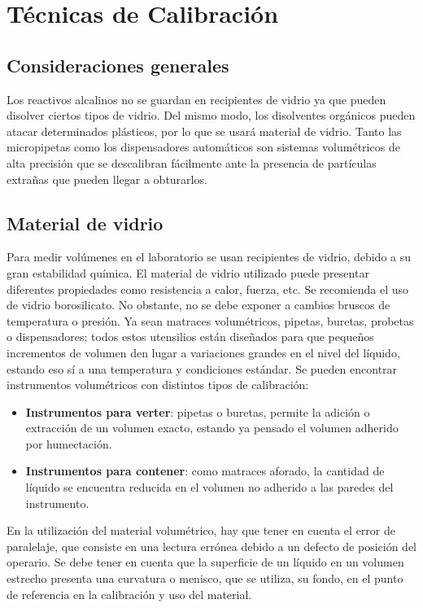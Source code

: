 \chapter{Técnicas de Calibración}
\section{Consideraciones generales}
Los reactivos alcalinos no se guardan en recipientes de vidrio ya que pueden disolver ciertos tipos de vidrio. Del mismo modo, los disolventes orgánicos pueden atacar determinados plásticos, por lo que se usará material de vidrio. Tanto las micropipetas como los dispensadores automáticos son sistemas volumétricos de alta precisión que se descalibran fácilmente ante la presencia de partículas extrañas que pueden llegar a obturarlos.
\section{Material de vidrio}
Para medir volúmenes en el laboratorio se usan recipientes de vidrio, debido a su gran estabilidad química. El material de vidrio utilizado puede presentar diferentes propiedades como resistencia a calor, fuerza, etc. Se recomienda el uso de vidrio borosilicato. No obstante, no se debe exponer a cambios bruscos de temperatura o presión. Ya sean matraces volumétricos, pipetas, buretas, probetas o dispensadores; todos estos utensilios están diseñados para que pequeños incrementos de volumen den lugar a variaciones grandes en el nivel del líquido, estando eso sí a una temperatura y condiciones estándar. Se pueden encontrar instrumentos volumétricos con distintos tipos de calibración:
\begin{itemize}[itemsep=0pt,parsep=0pt,topsep=0pt,partopsep=0pt]
    \item \textbf{Instrumentos para verter}: pipetas o buretas, permite la adición o extracción de un volumen exacto, estando ya pensado el volumen adherido por humectación.
    \item\textbf{Instrumentos para contener}: como matraces aforado, la cantidad de líquido se encuentra reducida en el volumen no adherido a las paredes del instrumento.
\end{itemize}

En la utilización del material volumétrico, hay que tener en cuenta el error de paralelaje, que consiste en una lectura errónea debido a un defecto de posición del operario. Se debe tener en cuenta que la superficie de un líquido en un volumen estrecho presenta una curvatura o menisco, que se utiliza, su fondo, en el punto de referencia en la calibración y uso del material.
